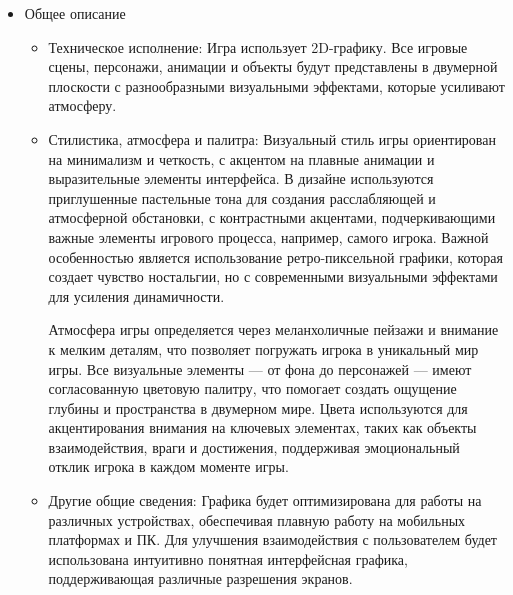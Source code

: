 \documentclass{article}
\begin{document}
\begin{itemize}
    \item Общее описание
    \begin{itemize}
        \item Техническое исполнение:
        Игра использует 2D-графику. Все игровые сцены, персонажи, анимации и объекты будут представлены в двумерной плоскости с разнообразными визуальными эффектами, которые усиливают атмосферу.
        \item Стилистика, атмосфера и палитра:
        Визуальный стиль игры ориентирован на минимализм и четкость, с акцентом на плавные анимации и выразительные элементы интерфейса. В дизайне используются приглушенные пастельные тона для создания расслабляющей и атмосферной обстановки, с контрастными акцентами, подчеркивающими важные элементы игрового процесса, например, самого игрока. Важной особенностью является использование ретро-пиксельной графики, которая создает чувство ностальгии, но с современными визуальными эффектами для усиления динамичности.
        
        Атмосфера игры определяется через меланхоличные пейзажи и внимание к мелким деталям, что позволяет погружать игрока в уникальный мир игры. Все визуальные элементы — от фона до персонажей — имеют согласованную цветовую палитру, что помогает создать ощущение глубины и пространства в двумерном мире. Цвета используются для акцентирования внимания на ключевых элементах, таких как объекты взаимодействия, враги и достижения, поддерживая эмоциональный отклик игрока в каждом моменте игры.
        \item Другие общие сведения:
        Графика будет оптимизирована для работы на различных устройствах, обеспечивая плавную работу на мобильных платформах и ПК. Для улучшения взаимодействия с пользователем будет использована интуитивно понятная интерфейсная графика, поддерживающая различные разрешения экранов. 
    \end{itemize}


\end{itemize}
\end{document}
